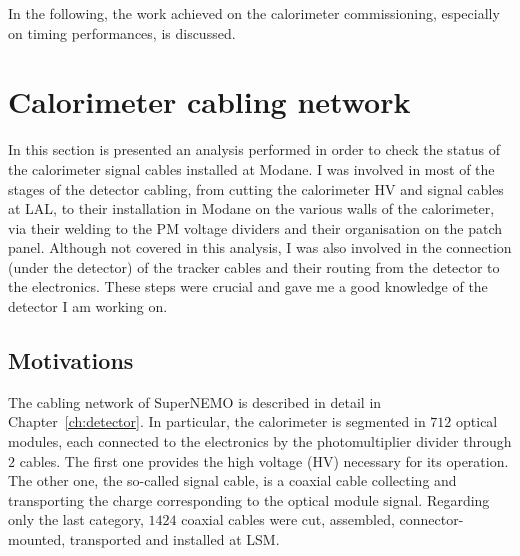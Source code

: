 In the following, the work achieved on the calorimeter commissioning, especially on timing performances, is discussed.


\section{Calorimeter cabling network}
\label{sec:reflecto}

In this section is presented an analysis performed in order to check the status of the calorimeter signal cables installed at Modane.
I was involved in most of the stages of the detector cabling, from cutting the calorimeter HV and signal cables at LAL, to their installation in Modane on the various walls of the calorimeter, via their welding to the PM voltage dividers and their organisation on the patch panel.
Although not covered in this analysis, I was also involved in the connection (under the detector) of the tracker cables and their routing from the detector to the electronics.
These steps were crucial and gave me a good knowledge of the detector I am working on.

\subsection{Motivations}

The cabling network of SuperNEMO is described in detail in Chapter~\ref{ch:detector}.
In particular, the calorimeter is segmented in $712$ optical modules, each connected to the electronics by the photomultiplier divider through $2$ cables.
The first one provides the high voltage (HV) necessary for its operation.
The other one, the so-called signal cable, is a coaxial cable collecting and transporting the charge corresponding to the optical module signal.
Regarding only the last category, $1424$ coaxial cables were cut, assembled, connector-mounted, transported and installed at LSM.

